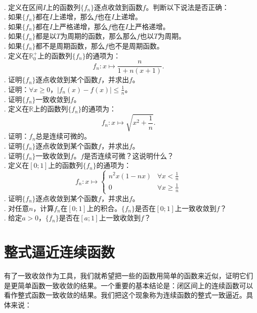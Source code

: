 \documentclass[12pt,UTF8,fontset=none]{ctexbook}
\begin{document}
\begin{xt}
    \mbox{} \\
    . 定义在区间$I$上的函数列$\{f_n\}$逐点收敛到函数$f$。判断以下说法是否正确：\\
    . 如果$\{f_n\}$都在$I$上递增，那么$f$也在$I$上递增。\\
    . 如果$\{f_n\}$都在$I$上严格递增，那么$f$也在$I$上严格递增。\\
    . 如果$\{f_n\}$都是以$T$为周期的函数，那么那么$f$也以$T$为周期。\\
    . 如果$\{f_n\}$都不是周期函数，那么$f$也不是周期函数。\\
    . 定义在$\mathbb{R}_0^+$上的函数列$\{f_n\}$的通项为：
    $$ f_n: x\mapsto \frac{n}{1 + n( x + 1)}. $$
    . 证明$\{f_n\}$逐点收敛到某个函数$f$，并求出$f$。\\
    . 证明：$\forall x \geqslant 0$，$|f_n(x) - f(x)| \leqslant \frac{1}{n}$。\\
    . 证明$\{f_n\}$一致收敛到$f$。\\
    . 定义在$\mathbb{R}$上的函数列$\{f_n\}$的通项为：
    $$ f_n: x\mapsto \sqrt{x^2 + \frac{1}{n}}. $$
    . 证明：$f_n$总是连续可微的。\\
    . 证明$\{f_n\}$逐点收敛到某个函数$f$，并求出$f$。\\
    . 证明$\{f_n\}$一致收敛到$f$。$f$是否连续可微？这说明什么？\\
    . 定义在$[0;1]$上的函数列$\{f_n\}$的通项为：
    $$ f_n: x\mapsto \begin{cases}
        n^2x(1 - nx) & \forall x < \frac{1}{n} \\
        0 & \forall x \geqslant \frac{1}{n}
    \end{cases} $$
    . 证明$\{f_n\}$逐点收敛到某个函数$f$，并求出$f$。\\
    . 对任意$n$，计算$f_n$在$[0;1]$上的积合。$\{f_n\}$是否在$[0;1]$上一致收敛到$f$？\\
    . 给定$a>0$，$\{f_n\}$是否在$[a;1]$上一致收敛到$f$？
\end{xt}

\section{整式逼近连续函数}
有了一致收敛作为工具，我们就希望把一些的函数用简单的函数来近似，证明它们是更简单函数一致收敛的结果。一个重要的基本结论是：闭区间上的连续函数可以看作整式函数一致收敛的结果。我们把这个现象称为连续函数的整式一致逼近。具体来说：
\end{document}
